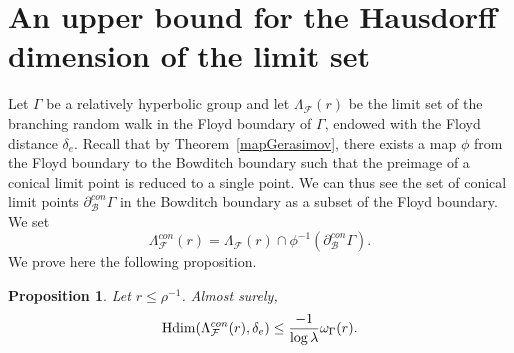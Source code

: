 \documentclass{amsart}
\newcommand{\showcomments}{yes}
\newenvironment{comment}%
{\ifthenelse{\equal{\showcomments}{yes}}%
{\footnotemark
    \begin{lrbox}{\commentbox}
    \begin{minipage}[t]{1.25in}\raggedright\sffamily\upshape\tiny
    \footnotemark[\arabic{footnote}]}%
{\begin{lrbox}{\commentbox}}}%
{\ifthenelse{\equal{\showcomments}{yes}}%
{\end{minipage}\end{lrbox}\marginpar{\usebox{\commentbox}}}%
{\end{lrbox}}}
\newtheorem{prop}[thm]{Proposition}
\theoremstyle{definition}
\theoremstyle{remark}
\newcommand{\Hdim}{{\rm Hdim}}
\begin{document}
\section{An upper bound for the Hausdorff dimension of the limit set}\label{SectionupperboundHausdorff}
Let $\Gamma$ be a  relatively hyperbolic group and let $\Lambda_\mathcal{F}(r)$ be the limit set of the branching random walk in the Floyd boundary of $\Gamma$, endowed with the Floyd distance $\delta_e$.
Recall that by Theorem~\ref{mapGerasimov}, there exists a map $\phi$ from the Floyd boundary to the Bowditch boundary such that the preimage of a conical limit point is reduced to a single point.
We can thus see the set of conical limit points $\partial_{\mathcal{B}}^{con}\Gamma$ in the Bowditch boundary as a subset of the Floyd boundary.
We set
$$\Lambda^{con}_{\mathcal{F}}(r)=\Lambda_{\mathcal{F}}(r)\cap \phi^{-1}(\partial_{\mathcal{B}}^{con}\Gamma).$$
We prove here the following proposition. %

\begin{prop}\label{upperboundHausdorff}
Let $r\leq \rho^{-1}$.
Almost surely, %
$$\Hdim(\Lambda^{con}_{\mathcal{F}}(r),\delta_e)\leq \frac{-1}{\log \lambda}\omega_{\Gamma}(r).$$
\end{prop}
\end{document}
